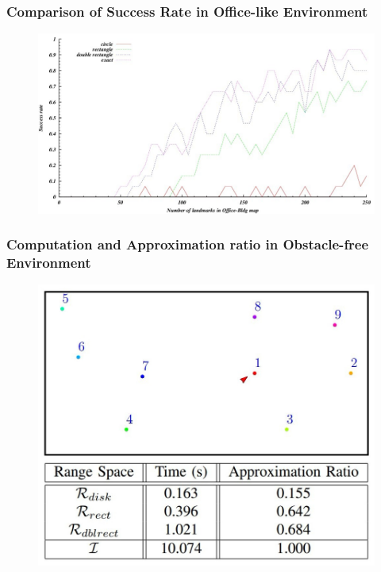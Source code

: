 \documentclass[compress]{beamer}
\begin{document}
\begin{frame} \frametitle{Comparison of Success Rate in Office-like Environment}
\begin{figure}
    \includegraphics[scale=0.44]{rate-office.jpg}
\end{figure}
\end{frame}

\begin{frame} \frametitle{Computation and Approximation ratio in Obstacle-free Environment}
\begin{figure}
    \includegraphics[scale=0.35]{obs_tab.jpg}
\end{figure}
\end{frame}
\end{document}
